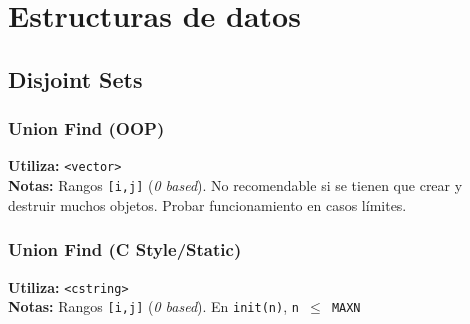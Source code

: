 \section{Estructuras de datos}

\subsection{Disjoint Sets}
\subsubsection{Union Find (OOP)}
\begin{footnotesize}
	\textbf{Utiliza:} \texttt{<vector>}\\
	\textbf{Notas:} Rangos \texttt{[i,j]} (\textit{0 based}). No recomendable si se tienen que crear y destruir muchos objetos. Probar funcionamiento en casos l\'imites. 
\end{footnotesize}

\subsubsection{Union Find (C Style/Static)}
\begin{footnotesize}
	\textbf{Utiliza:} \texttt{<cstring>}\\
	\textbf{Notas:} Rangos \texttt{[i,j]} (\textit{0 based}). En \texttt{init(n)}, \texttt{n $\leq$ MAXN}
\end{footnotesize}



